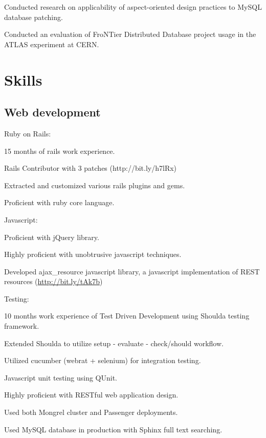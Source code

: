 \documentclass{resume}
\begin{document}
\begin{compactitem}
  \item Conducted research on applicability of aspect-oriented design practices to MySQL database patching.
  \item Conducted an evaluation of FroNTier Distributed Database project usage in the ATLAS experiment at CERN.
\end{compactitem}

\section{Skills}

\subsection{Web development}

\begin{compactitem}
  \item Ruby on Rails:
    \begin{compactitem}
      \item 15 months of rails work experience.
      \item Rails Contributor with 3 patches (http://bit.ly/h7lRx)
      \item Extracted and customized various rails plugins and gems.
      \item Proficient with ruby core language.
    \end{compactitem}

  \item Javascript:
    \begin{compactitem}
      \item Proficient with jQuery library.
      \item Highly proficient with unobtrusive javascript techniques.
      \item Developed ajax\_resource javascript library, a javascript implementation of REST resources (\url{http://bit.ly/tAk7b})
    \end{compactitem}

  \item Testing:
    \begin{compactitem}
      \item 10 months work experience of Test Driven Development using Shoulda testing framework.
      \item Extended Shoulda to utilize setup - evaluate - check/should workflow.
      \item Utilized cucumber (webrat + selenium) for integration testing.
      \item Javascript unit testing using QUnit.
    \end{compactitem}

  \item Highly proficient with RESTful web application design.
  \item Used both Mongrel cluster and Passenger deployments.
  \item Used MySQL database in production with Sphinx full text searching.
\end{compactitem}
\end{document}
